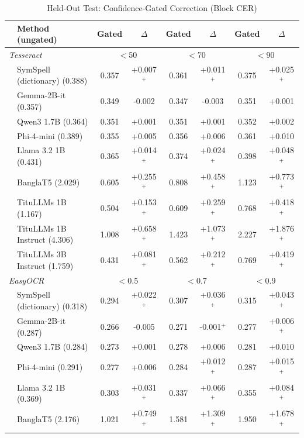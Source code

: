 \begin{table}[t]
\centering
\caption{Held-Out Test: Confidence-Gated Correction (Block CER)}
\label{tab:testgating}
\setlength{\tabcolsep}{3pt}
\footnotesize
\begin{tabular}{llcccccc}
\toprule
& Method (ungated) & Gated & $\Delta$ & Gated & $\Delta$ & Gated & $\Delta$ \\
\midrule
\multicolumn{2}{l}{\textit{Tesseract}} & \multicolumn{2}{c}{$<$50} & \multicolumn{2}{c}{$<$70} & \multicolumn{2}{c}{$<$90} \\
& SymSpell (dictionary) (0.388) & 0.357 & +0.007$^{+}$ & 0.361 & +0.011$^{+}$ & 0.375 & +0.025$^{+}$ \\
& Gemma-2B-it (0.357) & 0.349 & -0.002 & 0.347 & -0.003 & 0.351 & +0.001 \\
& Qwen3 1.7B (0.364) & 0.351 & +0.001 & 0.351 & +0.001 & 0.352 & +0.002 \\
& Phi-4-mini (0.389) & 0.355 & +0.005 & 0.356 & +0.006 & 0.361 & +0.010 \\
& Llama 3.2 1B (0.431) & 0.365 & +0.014$^{+}$ & 0.374 & +0.024$^{+}$ & 0.398 & +0.048$^{+}$ \\
& BanglaT5 (2.029) & 0.605 & +0.255$^{+}$ & 0.808 & +0.458$^{+}$ & 1.123 & +0.773$^{+}$ \\
& TituLLMs 1B (1.167) & 0.504 & +0.153$^{+}$ & 0.609 & +0.259$^{+}$ & 0.768 & +0.418$^{+}$ \\
& TituLLMs 1B Instruct (4.306) & 1.008 & +0.658$^{+}$ & 1.423 & +1.073$^{+}$ & 2.227 & +1.876$^{+}$ \\
& TituLLMs 3B Instruct (1.759) & 0.431 & +0.081$^{+}$ & 0.562 & +0.212$^{+}$ & 0.769 & +0.419$^{+}$ \\
\midrule
\multicolumn{2}{l}{\textit{EasyOCR}} & \multicolumn{2}{c}{$<$0.5} & \multicolumn{2}{c}{$<$0.7} & \multicolumn{2}{c}{$<$0.9} \\
& SymSpell (dictionary) (0.318) & 0.294 & +0.022$^{+}$ & 0.307 & +0.036$^{+}$ & 0.315 & +0.043$^{+}$ \\
& Gemma-2B-it (0.287) & 0.266 & -0.005 & 0.271 & -0.001$^{+}$ & 0.277 & +0.006$^{+}$ \\
& Qwen3 1.7B (0.284) & 0.273 & +0.001 & 0.278 & +0.006 & 0.281 & +0.010 \\
& Phi-4-mini (0.291) & 0.277 & +0.006 & 0.284 & +0.012$^{+}$ & 0.287 & +0.015$^{+}$ \\
& Llama 3.2 1B (0.369) & 0.303 & +0.031$^{+}$ & 0.337 & +0.066$^{+}$ & 0.355 & +0.084$^{+}$ \\
& BanglaT5 (2.176) & 1.021 & +0.749$^{+}$ & 1.581 & +1.309$^{+}$ & 1.950 & +1.678$^{+}$ \\

\end{tabular}
\end{table}

